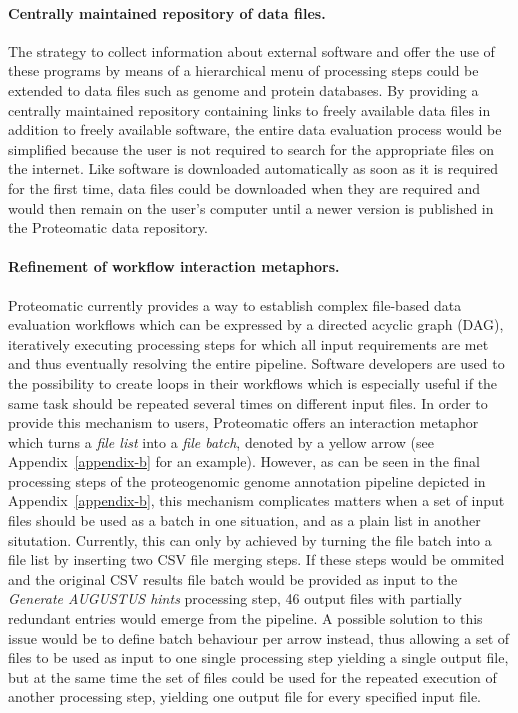 \paragraph{Centrally maintained repository of data files.}

The strategy to collect information about external software and offer the
use of these programs by means of a hierarchical menu of processing steps
could be extended to data files such as genome and protein databases.
By providing a centrally maintained repository containing links to freely
available data files in addition to freely available software, the entire
data evaluation process would be simplified because the user is not
required to search for the appropriate files on the internet.
Like software is downloaded automatically as soon as it is required for the 
first time, data files could be downloaded when they are required and would
then remain on the user's computer until a newer version is published in
the Proteomatic data repository.

\paragraph{Refinement of workflow interaction metaphors.}

Proteomatic currently provides a way to establish complex file-based data 
evaluation workflows which can be expressed by a directed acyclic graph (DAG),
iteratively executing processing steps for which all input requirements are
met and thus eventually resolving the entire pipeline.
Software developers are used to the possibility to create loops in their
workflows which is especially useful if the same task should be repeated
several times on different input files.
In order to provide this mechanism to users, Proteomatic offers an interaction 
metaphor which turns a {\em file list} into a {\em file batch}, denoted by a 
yellow arrow (see Appendix~\ref{appendix-b} for an example).
However, as can be seen in the final processing steps of the proteogenomic
genome annotation pipeline depicted in Appendix~\ref{appendix-b}, 
this mechanism complicates matters when
a set of input files should be used as a batch in one situation, and as a
plain list in another situtation.
Currently, this can only by achieved by turning the file batch into a file
list by inserting two CSV file merging steps.
If these steps would be ommited and the original CSV results file batch
would be provided as input to the {\em Generate AUGUSTUS hints} processing
step, 46 output files with partially redundant entries would emerge from
the pipeline.
A possible solution to this issue would be to define batch behaviour per
arrow instead, thus allowing a set of files to be used as input to one single 
processing step yielding a single output file, but at the same time the
set of files could be used for the repeated execution of another processing
step, yielding one output file for every specified input file.

